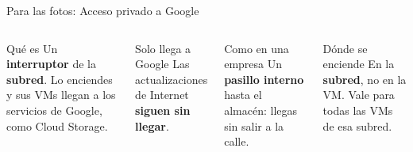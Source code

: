 \documentclass[aspectratio=169,10pt,c]{beamer}
\begin{document}
\begin{frame}{Para las fotos: Acceso privado a Google}
\begin{center}
\end{center}
\begin{columns}[T,onlytextwidth]
\begin{block}{Qué es}
\small Un \textbf{interruptor} de la \textbf{subred}. Lo enciendes y sus VMs llegan a los servicios de Google, como Cloud Storage.
\end{block}
\begin{alertblock}{Solo llega a Google}
\small Las actualizaciones de Internet \textbf{siguen sin llegar}.
\end{alertblock}
\begin{exampleblock}{Como en una empresa}
\small Un \textbf{pasillo interno} hasta el almacén: llegas sin salir a la calle.
\end{exampleblock}
\begin{block}{Dónde se enciende}
\small En la \textbf{subred}, no en la VM. Vale para todas las VMs de esa subred.
\end{block}
\end{columns}
\end{frame}
\end{document}

